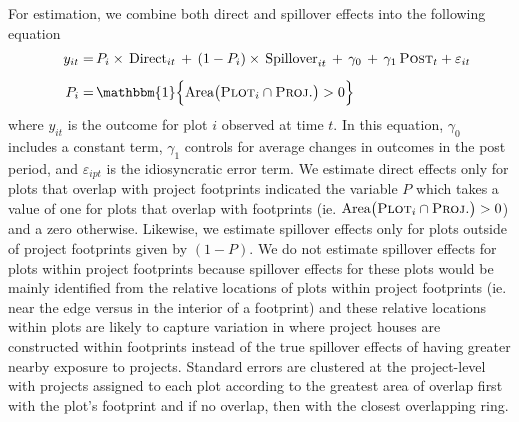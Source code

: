 \documentclass[12pt]{article}
\begin{document}
For estimation, we combine both direct and spillover effects into the following equation
\begin{align}
\label{eq:main}
\begin{split}
\quad y_{it}  =\,& P_i \times \, \text{Direct}_{it} \, + \, (1- P_i) \times \, \text{Spillover}_{it} \,+\, \gamma_0 \,+\, \gamma_1 \, \textsc{Post}_t + \varepsilon_{it} \\[.5em]
P_i =\,& \mathbbm{1}\Big\{\text{Area}\big(\textsc{Plot}_i  \cap  \textsc{Proj.}\big)>0\Big \}\,
\end{split}
\end{align}
\noindent where $y_{it}$ is the outcome for plot $i$ observed at time $t$.  In this equation, $\gamma_0$ includes a constant term, $\gamma_1$ controls for average changes in outcomes in the post period, and $\varepsilon_{ipt}$ is the idiosyncratic error term.  We estimate direct effects only for plots that overlap with project footprints indicated the variable $P$ which takes a value of one for plots that overlap with footprints (ie. $\text{Area}\big(\textsc{Plot}_i  \cap  \textsc{Proj.}\big)>0$) and a zero otherwise.  Likewise, we estimate spillover effects only for plots outside of project footprints given by $(1-P)$.  We do not estimate spillover effects for plots within project footprints because spillover effects for these plots would be mainly identified from the relative locations of plots within project footprints (ie. near the edge versus in the interior of a footprint) and these relative locations within plots are likely to capture variation in where project houses are constructed within footprints instead of the true spillover effects of having greater nearby exposure to projects.  Standard errors are clustered at the project-level with projects assigned to each plot according to the greatest area of overlap first with the plot's footprint and if no overlap, then with the closest overlapping ring.
\end{document}
